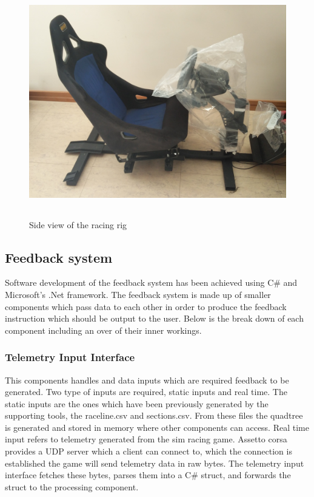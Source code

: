 \begin{figure}[!htb]
	\centering
	\includegraphics[height=10cm]{images/RacingRig}
	\caption{Side view of the racing rig}
	\label{fig:RacingRig}
\end{figure}

\subsection{Feedback system}
Software development of the feedback system has been achieved using C\# and Microsoft's .Net framework. The feedback system is made up of smaller components which pass data to each other in order to produce the feedback instruction which should be output to the user. Below is the break down of each component including an over of their inner workings.

\subsubsection{Telemetry Input Interface}
This components handles and data inputs which are required feedback to be generated. Two type of inputs are required, static inputs and real time. The static inputs are the ones which have been previously generated by the supporting tools, the raceline.csv and sections.csv. From these files the quadtree is generated and stored in memory where other components can access. Real time input refers to telemetry generated from the sim racing game. Assetto corsa provides a UDP server which a client can connect to, which the connection is established the game will send telemetry data in raw bytes. The telemetry input interface fetches these bytes, parses them into a C\# struct, and forwards the struct to the processing component.

